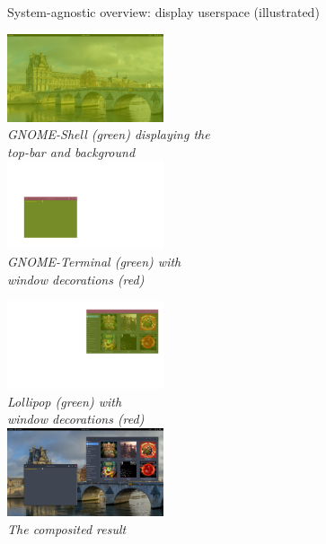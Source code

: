 \begin{frame}{System-agnostic overview: display userspace (illustrated)}

  \begin{minipage}[t]{0.49\textwidth}
    \centering
    \includegraphics[height=7em]{slides/graphics-software/compositing-gnome-shell.jpg}\\
    \textit{\small GNOME-Shell (green) displaying the\\ top-bar and background}\\
    \vspace{0.5em}
    \includegraphics[height=7em]{slides/graphics-software/compositing-gnome-terminal.jpg}\\
    \textit{\small GNOME-Terminal (green) with\\ window decorations (red)}
  \end{minipage}
  \hfill
  \begin{minipage}[t]{0.49\textwidth}
    \centering
    \includegraphics[height=7em]{slides/graphics-software/compositing-lollipop.jpg}\\
    \textit{\small Lollipop (green) with\\ window decorations (red)}\\
    \vspace{0.5em}
    \includegraphics[height=7em]{slides/graphics-software/compositing-result.jpg}\\
    \textit{\small The composited result}
  \end{minipage}
\end{frame}

